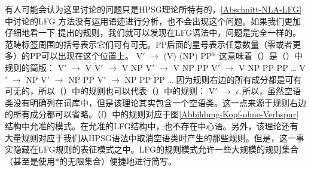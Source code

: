 有人可能会认为这里讨论的问题只是HPSG\indexlfgstartc 理论所特有的，\ref{Abschnitt-NLA-LFG}中讨论的LFG
方法没有运用语迹进行分析，也不会出现这个问题。如果我们更加仔细地看一下 \citet[]{Dalrymple2006a}提出的规则，我们就可以发现在LFG语法中，问题是完全一样的。范畴标签周围的括号表示它们可有可无。PP后面的星号表示任意数量（零或者更多）的PP可以出现在这个位置上。
\ea
V$'$ $\to$ (V) (NP) PP*
\z
这意味着（）是（）中规则的简版：
\eal
\ex V$'$ $\to$ V
\ex V$'$ $\to$ V NP
\ex V$'$ $\to$ V NP PP
\ex V$'$ $\to$ V NP PP PP
\ex \ldots
\ex V$'$ $\to$ NP
\ex V$'$ $\to$ NP PP
\ex V$'$ $\to$ NP PP PP
\ex \ldots
\zl
因为规则右边的所有成分都是可有可无的，所以（）中的规则也可以代表（）中的规则：
\ea
V$'$ $\to$ $\epsilon$
\z
所以，虽然空语类没有明确列在词库中，但是该理论其实包含一个空语类。这一点来源于规则右边的所有成分都可以省略。（f）中的规则对应于图\ref{Abbildung-Kopf-ohne-Verbspur}结构中允准的模式。在允准的LFG结构中，也不存在中心语。另外，该理论还有大量规则对应于我们从HPSG语法中取消空语类时产生的那些规则。但是，这一事实隐藏在LFG规则的表征模式之中。LFG的规则模式允许一些大规模的规则集合（甚至是使用*的无限集合）便捷地进行简写\indexlfgendc。

